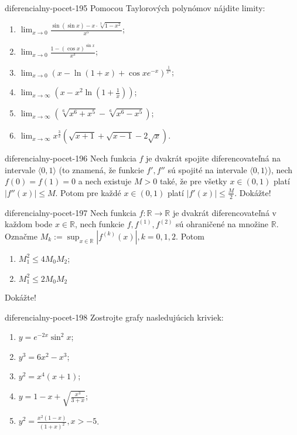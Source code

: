 \begin{defproblem}{diferencialny-pocet-195}
Pomocou Taylorových polynómov nájdite limity:
\begin{multicols}{2}
\begin{enumerate}
	\item $\lim_{x\rightarrow 0}\frac{\sin (\sin x)-x\cdot\sqrt[3]{1-x^2}}{x^5}$;
	\item $\lim_{x\rightarrow 0}\frac{1-(\cos x)^{\sin x}}{x^3}$;
	\item $\lim_{x\rightarrow 0}(x-\ln (1+x)+\cos xe^{-x})^{\frac{1}{x^3}}$;
	\item $\lim_{x\rightarrow \infty}(x-x^2\ln (1+\frac{1}{x}))$;
	\item $\lim_{x\rightarrow \infty}(\sqrt[6]{x^6+x^5}-\sqrt[6]{x^6-x^5})$;
	\item $\lim_{x\rightarrow \infty}x^{\frac{3}{2}}(\sqrt{x+1}+\sqrt{x-1}-2\sqrt{x})$.
\end{enumerate}
\end{multicols}
\end{defproblem}

\begin{defproblem}{diferencialny-pocet-196}
Nech funkcia $f$ je dvakrát spojite diferencovateľná na intervale $\langle 0,1 \rangle$ (to znamená, že funkcie $f',f''$ sú spojité na intervale $\langle 0,1 \rangle$), nech $f(0)=f(1)=0$ a nech existuje $M>0$ také, že pre všetky $x\in (0,1)$ platí $|f''(x)|\leq M$. Potom pre každé $x\in (0,1)$ platí $|f'(x)|\leq \frac{M}{2}$. Dokážte!
\end{defproblem}

\begin{defproblem}{diferencialny-pocet-197}
Nech funkcia $f:\mathbb{R}\rightarrow\mathbb{R}$ je dvakrát diferencovateľná v každom bode $x\in\mathbb{R}$, nech funkcie $f,f^{(1)},f^{(2)}$ sú ohraničené na množine $\mathbb{R}$. Označme $M_k:=\sup_{x\in\mathbb{R}}|f^{(k)}(x)|,k=0,1,2$. Potom
\begin{enumerate}
\item $M^2_1\leq 4M_0M_2$;
\item $M^2_1\leq 2M_0M_2$
\end{enumerate}
Dokážte!
\end{defproblem}

\begin{defproblem}{diferencialny-pocet-198}
Zostrojte grafy nasledujúcich kriviek:
\begin{multicols}{2}
\begin{enumerate}
	\item $y=e^{-2x}\sin^2 x$;
	\item $y^3=6x^2-x^3$;
	\item $y^2=x^4(x+1)$;
	\item $y=1-x+\sqrt{\frac{x^3}{3+x}}$;
	\item $y^2=\frac{x^2(1-x)}{(1+x)^2},x>-5$.
\end{enumerate}
\end{multicols}
\end{defproblem}

